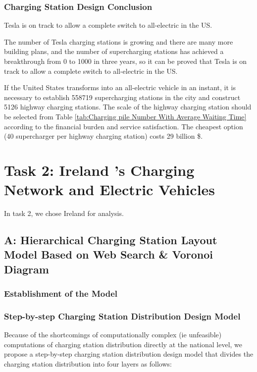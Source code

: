 \documentclass{mcmthesis}
\begin{document}
\subsubsection{Charging Station Design Conclusion}


\par Tesla is on track to allow a complete switch to all-electric in the US.
\par The number of Tesla charging stations is growing and there are many more building plans, and the number of supercharging stations has achieved a breakthrough from 0 to 1000 in three years, so it can be proved that Tesla is on track to allow a complete switch to all-electric in the US.

\par If the United States transforms into an all-electric vehicle in an instant, it is necessary to establish 558719 supercharging stations in the city and construct 5126 highway charging stations. The scale of the highway charging station should be selected from Table \ref{tab:Charging pile Number With Average Waiting Time} according to the financial burden and service satisfaction. The cheapest option (40 supercharger per highway charging station) costs 29 billion \$.



\section{Task 2: Ireland 's Charging Network and Electric Vehicles}

\par In task 2, we chose Ireland for analysis.

\subsection{A: Hierarchical Charging Station Layout Model Based on Web Search \& Voronoi Diagram}

\subsubsection{Establishment of the Model}

\subsubsection*{Step-by-step Charging Station Distribution Design Model}

\par Because of the shortcomings of computationally complex (ie unfeasible) computations of charging station distribution directly at the national level, we propose a step-by-step charging station distribution design model that divides the charging station distribution into four layers as follows:
\end{document}
